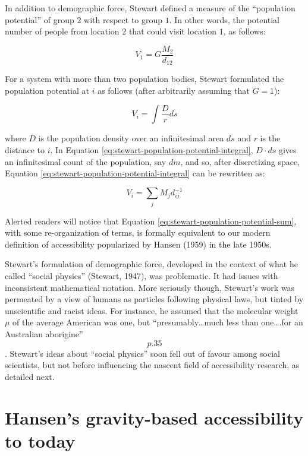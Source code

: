 \documentclass[
11pt, %
oneside, %
english, %
singlespacing, %
]{macthesis} %
\begin{document}
In addition to demographic force, Stewart defined a measure of the ``population potential'' of group \(2\) with respect to group \(1\). In other words, the potential number of people from location \(2\) that could visit location \(1\), as follows:

\begin{equation}
\label{eq:stewart-population-potential}
V_1 = G\frac{M_2}{d_{12}}
\end{equation} 

For a system with more than two population bodies, Stewart formulated the population potential at \(i\) as follows (after arbitrarily assuming that \(G=1\)):

\begin{equation}
\label{eq:stewart-population-potential-integral}
V_i = \int\frac{D}{r} ds
\end{equation} 

\noindent where \(D\) is the population density over an infinitesimal area \(ds\) and \(r\) is the distance to \(i\). In Equation \ref{eq:stewart-population-potential-integral}, \(D\cdot ds\) gives an infinitesimal count of the population, say \(dm\), and so, after discretizing space, Equation \ref{eq:stewart-population-potential-integral} can be rewritten as:

\begin{equation}
\label{eq:stewart-population-potential-sum}
V_i = \sum_j M_jd_{ij}^{-1}
\end{equation} 

Alerted readers will notice that Equation \ref{eq:stewart-population-potential-sum}, with some re-organization of terms, is formally equivalent to our modern definition of accessibility popularized by Hansen (1959) in the late 1950s.

Stewart's formulation of demographic force, developed in the context of what he called ``social physics'' (Stewart, 1947), was problematic. It had issues with inconsistent mathematical notation. More seriously though, Stewart's work was permeated by a view of humans as particles following physical laws, but tinted by unscientific and racist ideas. For instance, he assumed that the molecular weight \(\mu\) of the average American was one, but ``presumably\ldots much less than one\ldots.for an Australian aborigine'' \[p. 35\]. Stewart's ideas about ``social physics'' soon fell out of favour among social scientists, but not before influencing the nascent field of accessibility research, as detailed next.

\section{Hansen's gravity-based accessibility to today}\label{grav-to-today}
\end{document}
